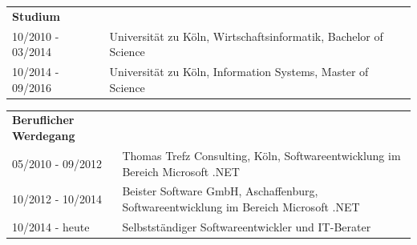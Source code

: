 \begin{flushleft}
\vspace{-1.5em}

\begin{tabular}{p{11em} p{22.5em}}
    \textbf{Studium} & \addspace \\
    10/2010 - 03/2014 & Universität zu Köln, Wirtschaftsinformatik, Bachelor of Science \\
    10/2014 - 09/2016 & Universität zu Köln, Information Systems, Master of Science
\end{tabular}

\vspace{0.5em}

\begin{tabular}{p{11em} p{22.5em}}
    \textbf{Beruflicher Werdegang} & \addspace \\
    05/2010 - 09/2012 & Thomas Trefz Consulting, Köln, Softwareentwicklung im Bereich Microsoft .NET \\
    10/2012 - 10/2014 & Beister Software GmbH, Aschaffenburg, Softwareentwicklung im Bereich Microsoft .NET \\
    10/2014 - heute & Selbstständiger Softwareentwickler und IT-Berater
\end{tabular}

\end{flushleft}